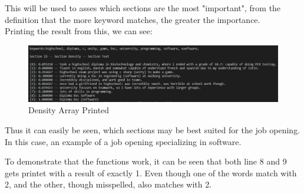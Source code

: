 This will be used to asses which sections are the most "important", from the definition that the more keyword matches, the greater the importance.
\\
Printing the result from this, we can see:
\begin{figure}[H]
  \centering
  \includegraphics[scale = 0.6]{figures/density_example.png}
  \caption{Density Array Printed}\label{fig:ie}
\end{figure}
Thus it can easily be seen, which sections may be best suited for the job opening. 
In this case, an example of a job opening specializing in software.

To demonstrate that the functions work, it can be seen that both line 8 and 9 gets printet with a result of exactly 1.
Even though one of the words match with 2, and the other, though misspelled, also matches with 2.

